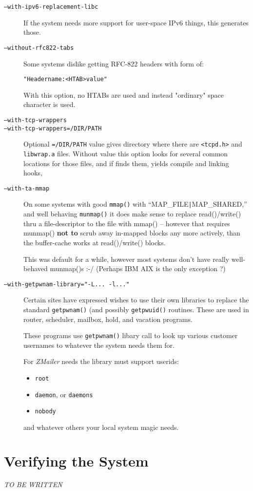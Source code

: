 \begin{multicols}{2}
\begin{description}
\item[\tt --with-ipv6-replacement-libc] \mbox{}

If the system needs more support for user-space IPv6
things, this generates those.

\item[\tt --without-rfc822-tabs] \mbox{}

Some systems dislike getting RFC-822 headers with form of:
\begin{alltt}
   "Headername: <HTAB> value"
\end{alltt}
With this option, no HTABs are used and instead "ordinary"
space character is used.

\item[\tt --with-tcp-wrappers]
\item[\tt --with-tcp-wrappers=/DIR/PATH] \mbox{}

Optional  {\tt =/DIR/PATH}  value gives directory where there are
{\tt <tcpd.h>}  and  {\tt libwrap.a}  files.
Without value this option looks for several common locations
for those files, and if finds them, yields compile and linking
hooks,

\item[\tt --with-ta-mmap] \mbox{}

On some systems with good {\tt mmap()} with ``MAP\_FILE\verb/|/MAP\_SHARED,''
and well behaving  {\tt munmap()}  it does make sense to replace
read()/write() thru a file-descriptor to the file with
mmap() -- however that requires munmap() {\bf not to} scrub
away in-mapped blocks any more actively, than the buffer-cache
works at read()/write() blocks.

This was default for a while, however most systems don't
have really well-behaved munmap()s :-/
(Perhaps IBM AIX is the only exception ?)

\item[\tt --with-getpwnam-library="-L... -l..."] \mbox{}

Certain sites have expressed wishes to use their own libraries
to replace the standard {\tt getpwnam()} (and possibly {\tt getpwuid()}
routines.
These are used in router, scheduler, mailbox, hold, and vacation
programs.

These programs use {\tt getpwnam()} libary call to look up
various customer usernames to whatever the system needs them
for.

For {\em ZMailer} needs the library must support userids:
\begin{itemize}
\item {\tt root}
\item {\tt daemon}, or {\tt daemons}
\item {\tt nobody}
\end{itemize}
and whatever others your local system magic needs.
\end{description}

\section{Verifying the System}

{\em\large TO BE WRITTEN}


\end{multicols}
